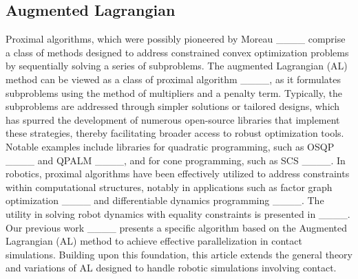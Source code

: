 \subsection{Augmented Lagrangian}
 
Proximal algorithms, which were possibly pioneered by Moreau ____ comprise a class of methods designed to address constrained convex optimization problems by sequentially solving a series of subproblems. 
The augmented Lagrangian (AL) method can be viewed as a class of proximal algorithm ____, as it formulates subproblems using the method of multipliers and a penalty term. 
Typically, the subproblems are addressed through simpler solutions or tailored designs, which has spurred the development of numerous open-source libraries that implement these strategies, thereby facilitating broader access to robust optimization tools. Notable examples include libraries for quadratic programming, such as OSQP ____ and QPALM ____, and for cone programming, such as SCS ____.
In robotics, proximal algorithms have been effectively utilized to address constraints within computational structures, notably in applications such as factor graph optimization ____ and differentiable dynamics programming ____.
The utility in solving robot dynamics with equality constraints is presented in ____. 
Our previous work ____ presents a specific algorithm based on the Augmented Lagrangian (AL) method to achieve effective parallelization in contact simulations. Building upon this foundation, this article extends the general theory and variations of AL designed to handle robotic simulations involving contact.
